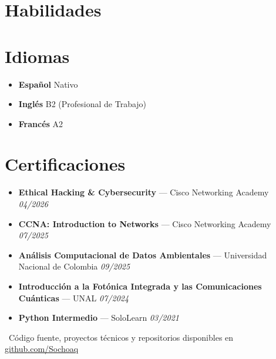 \documentclass[11pt,a4paper]{article}
\begin{document}
\section{Habilidades}
\begin{tcolorbox}[colback=lightgray, colframe=lightgray, boxrule=0pt, arc=6pt, left=10pt, right=10pt, top=10pt, bottom=10pt]
\noindent
\linespread{1.8}\selectfont
{}
\end{tcolorbox}

\section{Idiomas}
\begin{itemize}[label={}, leftmargin=0.3cm, itemsep=6pt]
    \item \textbf{Español} \hfill Nativo \quad \textcolor{accent}{\faCircle \faCircle \faCircle \faCircle \faCircle}
    \item \textbf{Inglés} \hfill B2 (Profesional de Trabajo) \quad \textcolor{accent}{\faCircle \faCircle \faCircle \faCircle} \textcolor{bulletline}{\faCircle}
    \item \textbf{Francés} \hfill A2 \quad \textcolor{accent}{\faCircle \faCircle} \textcolor{bulletline}{\faCircle \faCircle \faCircle}
\end{itemize}

\section{Certificaciones}
\begin{itemize}[label={\color{accentblue}\faAward}, leftmargin=0.6cm, itemsep=6pt]
    \item \textbf{Ethical Hacking \& Cybersecurity} --- Cisco Networking Academy \hfill \textit{04/2026}
    \item \textbf{CCNA: Introduction to Networks} --- Cisco Networking Academy \hfill \textit{07/2025}
    \item \textbf{Análisis Computacional de Datos Ambientales} --- Universidad Nacional de Colombia \hfill \textit{09/2025}
    \item \textbf{Introducción a la Fotónica Integrada y las Comunicaciones Cuánticas} --- UNAL \hfill \textit{07/2024}
    \item \textbf{Python Intermedio} --- SoloLearn \hfill \textit{03/2021}
\end{itemize}


\vfill
\begin{center}
    {\footnotesize\color{subtletext}
    \faGithub\ Código fuente, proyectos técnicos y repositorios disponibles en \href{https://github.com/Sochoaq}{github.com/Sochoaq}}
\end{center}
\end{document}
